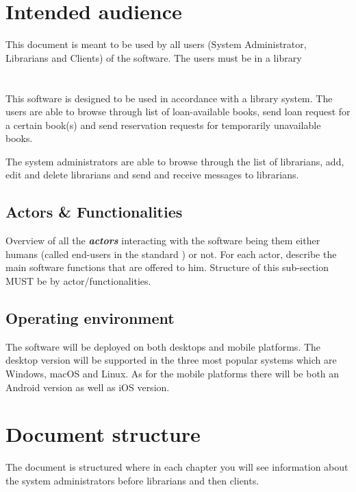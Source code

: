 \section{Intended audience}
This document is meant to be used by all users (System Administrator, Librarians
and Clients) of the \mysystemname software. The users must be in a library 


\section{\mysystemname}
This software is designed to be used in accordance with a library system.
The users are able to browse through list of loan-available books, send loan
request for a certain book(s) and send reservation requests for temporarily
unavailable books. 


The system administrators are able to browse through the list of librarians,
add, edit and delete librarians and send and receive messages to librarians.


\subsection{Actors \& Functionalities}
Overview of all the \textbf{\emph{\glspl{actor}}} interacting with the software
being them either humans (called end-users in the standard
\cite{IEEE-2001-userdocumentation}) or not. For each actor, describe the main
software functions that are offered to him. Structure of this sub-section MUST
be by actor/functionalities.


\subsection{Operating environment}
The software will be deployed on both desktops and mobile platforms. The desktop
version will be supported in the three most popular systems which are Windows,
macOS and Linux. As for the mobile platforms there will be both an Android
version as well as iOS version.

\section{Document structure}

The document is structured where in each chapter you will see information about
the system administrators before librarians and then clients. 







